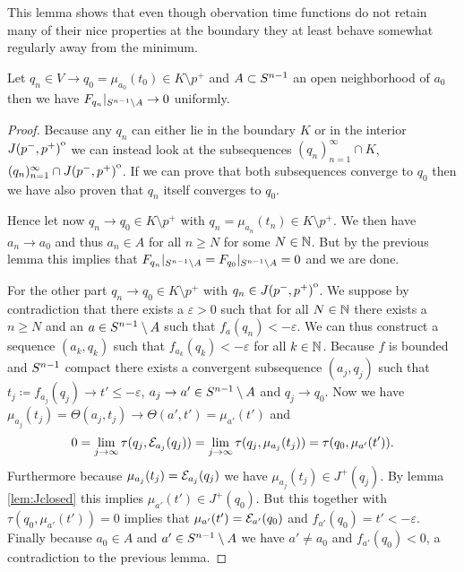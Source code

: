 This lemma shows that even though obervation time functions do not retain many of their nice properties at the boundary they at least behave somewhat regularly away from the minimum.
\begin{lemma}\label{lem:convto1}
    Let $q_n\in V\to q_0=\mu_{a_0}(t_0)\in K\setminus{p^+}$ and $A\subset {S^{n-1}}$ an open neighborhood of $a_0$ then we have $F_{q_n}\rvert_{{S^{n-1}}\setminus A} \to 0$ uniformly.
\end{lemma}
\begin{proof}
    Because any $q_n$ can either lie in the boundary $K$ or in the interior ${\kern0ptJ(p^-,p^+)}^{\mathrm{o}}$ we can instead look at the subsequences $(q_n)_{n=1}^\infty \cap K$, $(q_n)_{n=1}^\infty \cap {\kern0ptJ(p^-,p^+)}^{\mathrm{o}}$. If we can prove that both subsequences converge to $q_0$ then we have also proven that $q_n$ itself converges to $q_0$. 

    Hence let now $q_n \to q_0\in K\setminus p^+$ with $q_n=\mu_{a_n}(t_n) \in K\setminus p^+$. We then have $a_n\to a_0$ and thus $a_n \in A$ for all $n\ge N$ for some $N\in \mathbb{N}$. But by the previous lemma this implies that $F_{q_n}\rvert_{{S^{n-1}}\setminus A} = F_{q_0}\rvert_{{S^{n-1}}\setminus A} = 0$ and we are done.

    For the other part $q_n \to q_0\in K\setminus p^+$ with $q_n \in {\kern0ptJ(p^-,p^+)}^{\mathrm{o}}$.
    We suppose by contradiction that there exists a $\varepsilon>0$ such that for all $N\in \mathbb{N}$ there exists a $n\ge N$ and an $a\in {S^{n-1}}\setminus A$ such that $f_a(q_n)<-\varepsilon$. We can thus construct a sequence $(a_k, q_k)$ such that $f_{a_k}(q_k)<-\varepsilon$ for all $k\in \mathbb{N}$. Because $f$ is bounded and ${S^{n-1}}$ compact there exists a convergent subsequence $(a_j,q_j)$ such that $t_j\coloneqq f_{a_j}(q_j)\to t'\leq -\varepsilon$, $a_j \to a'\in {S^{n-1}}\setminus A$ and $q_j\to q_0$. Now we have $\mu_{a_j}(t_j) = \Theta(a_j,t_j) \to \Theta(a',t')=\mu_{a'}(t')$ and 
    \[
        0 = \lim_{j\to \infty}\tau(q_j,{\mathcal{E}}_{a_j}(q_j)) = \lim_{j\to \infty}\tau(q_j,\mu_{a_j}(t_j)) = \tau(q_0,\mu_{a'}(t')).
    \]
    Furthermore because $\mu_{a_j}(t_j)={\mathcal{E}}_{a_j}(q_j)$ we have $\mu_{a_j}(t_j)\in J^+(q_j)$. By lemma \ref{lem:Jclosed} this implies $\mu_{a'}(t')\in J^+(q_0)$. But this together with $\tau(q_0,\mu_{a'}(t'))=0$ implies that $\mu_{a'}(t')={\mathcal{E}}_{a'}(q_0)$ and $f_{a'}(q_0)=t'<-\varepsilon$. Finally because $a_0\in A$ and $a'\in {S^{n-1}}\setminus A$ we have $a'\neq a_0$ and $f_{a'}(q_0) <  0$, a contradiction to the previous lemma.
\end{proof}


